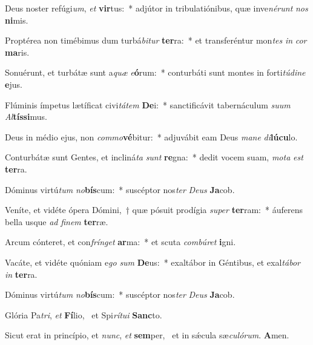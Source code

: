 \item Deus noster refúgi\textit{um}, \textit{et} \textbf{vir}tus:~* adjútor in tribulatiónibus, quæ inve\textit{né}\textit{runt} \textit{nos} \textbf{ni}mis.
\item Proptérea non timébimus dum turbá\textit{bi}\textit{tur} \textbf{ter}ra:~* et transferéntur mon\textit{tes} \textit{in} \textit{cor} \textbf{ma}ris.
\item Sonuérunt, et turbátæ sunt a\textit{quæ} \textit{e}\textbf{ó}rum:~* conturbáti sunt montes in forti\textit{tú}\textit{di}\textit{ne} \textbf{e}jus.
\item Flúminis ímpetus lætíficat civi\textit{tá}\textit{tem} \textbf{De}i:~* sanctificávit tabernáculum \textit{su}\textit{um} \textit{Al}\textbf{tís}\textbf{si}mus.
\item Deus in médio ejus, non \textit{com}\textit{mo}\textbf{vé}bitur:~* adjuvábit eam Deus \textit{ma}\textit{ne} \textit{di}\textbf{lú}\textbf{cu}lo.
\item Conturbátæ sunt Gentes, et incliná\textit{ta} \textit{sunt} \textbf{re}gna:~* dedit vocem suam, \textit{mo}\textit{ta} \textit{est} \textbf{ter}ra.
\item Dóminus virtú\textit{tum} \textit{no}\textbf{bís}\-cum:~* suscéptor nos\textit{ter} \textit{De}\textit{us} \textbf{Ja}cob.
\item Veníte, et vidéte ópera Dómini,~† quæ pósuit prodígia \textit{su}\textit{per} \textbf{ter}ram:~* áuferens bella usque \textit{ad} \textit{fi}\textit{nem} \textbf{ter}ræ.
\item Arcum cónteret, et con\textit{frín}\textit{get} \textbf{ar}ma:~* et scuta \textit{com}\textit{bú}\textit{ret} \textbf{i}gni.
\item Vacáte, et vidéte quóniam e\textit{go} \textit{sum} \textbf{De}us:~* exaltábor in Géntibus, et exal\textit{tá}\textit{bor} \textit{in} \textbf{ter}ra.
\item Dóminus virtú\textit{tum} \textit{no}\textbf{bís}\-cum:~* suscéptor nos\textit{ter} \textit{De}\textit{us} \textbf{Ja}cob.
\item Glória Pa\textit{tri}, \textit{et} \textbf{Fí}lio,~\psstar{} et Spi\textit{rí}\textit{tu}\textit{i} \textbf{Sanc}to.
\item Sicut erat in princípio, et \textit{nunc}, \textit{et} \textbf{sem}per,~\psstar{} et in sǽcula sæ\textit{cu}\textit{ló}\textit{rum}. \textbf{A}men.
